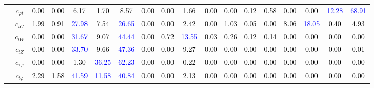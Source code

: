 \documentclass{article}
\begin{document}
\begin{landscape}
\begin{table}[H]
\begin{tabular}{|c|c|c|c|c|c|c|c|c|c|c|c|c|c|c|c|c|c|}
 & $c_{\varphi t}$ & \textcolor{black}{0.00} & \textcolor{black}{0.00} & \textcolor{black}{6.17} & \textcolor{black}{1.70} & \textcolor{black}{8.57} & \textcolor{black}{0.00} & \textcolor{black}{0.00} & \textcolor{black}{1.66} & \textcolor{black}{0.00} & \textcolor{black}{0.00} & \textcolor{black}{0.12} & \textcolor{black}{0.58} & \textcolor{black}{0.00} & \textcolor{black}{0.00} & \textcolor{blue}{12.28} & \textcolor{blue}{68.91}\\ \cline{2-18}
 & $c_{tG}$ & \textcolor{black}{1.99} & \textcolor{black}{0.91} & \textcolor{blue}{27.98} & \textcolor{black}{7.54} & \textcolor{blue}{26.65} & \textcolor{black}{0.00} & \textcolor{black}{0.00} & \textcolor{black}{2.42} & \textcolor{black}{0.00} & \textcolor{black}{1.03} & \textcolor{black}{0.05} & \textcolor{black}{0.00} & \textcolor{black}{8.06} & \textcolor{blue}{18.05} & \textcolor{black}{0.40} & \textcolor{black}{4.93}\\ \cline{2-18}
 & $c_{tW}$ & \textcolor{black}{0.00} & \textcolor{black}{0.00} & \textcolor{blue}{31.67} & \textcolor{black}{9.07} & \textcolor{blue}{44.44} & \textcolor{black}{0.00} & \textcolor{black}{0.72} & \textcolor{blue}{13.55} & \textcolor{black}{0.03} & \textcolor{black}{0.26} & \textcolor{black}{0.12} & \textcolor{black}{0.14} & \textcolor{black}{0.00} & \textcolor{black}{0.00} & \textcolor{black}{0.00} & \textcolor{black}{0.00}\\ \cline{2-18}
 & $c_{tZ}$ & \textcolor{black}{0.00} & \textcolor{black}{0.00} & \textcolor{blue}{33.70} & \textcolor{black}{9.66} & \textcolor{blue}{47.36} & \textcolor{black}{0.00} & \textcolor{black}{0.00} & \textcolor{black}{9.27} & \textcolor{black}{0.00} & \textcolor{black}{0.00} & \textcolor{black}{0.00} & \textcolor{black}{0.00} & \textcolor{black}{0.00} & \textcolor{black}{0.00} & \textcolor{black}{0.00} & \textcolor{black}{0.01}\\ \cline{2-18}
 & $c_{\tau \varphi}$ & \textcolor{black}{0.00} & \textcolor{black}{0.00} & \textcolor{black}{1.30} & \textcolor{blue}{36.25} & \textcolor{blue}{62.23} & \textcolor{black}{0.00} & \textcolor{black}{0.00} & \textcolor{black}{0.22} & \textcolor{black}{0.00} & \textcolor{black}{0.00} & \textcolor{black}{0.00} & \textcolor{black}{0.00} & \textcolor{black}{0.00} & \textcolor{black}{0.00} & \textcolor{black}{0.00} & \textcolor{black}{0.00}\\ \cline{2-18}
 & $c_{t \varphi}$ & \textcolor{black}{2.29} & \textcolor{black}{1.58} & \textcolor{blue}{41.59} & \textcolor{blue}{11.58} & \textcolor{blue}{40.84} & \textcolor{black}{0.00} & \textcolor{black}{0.00} & \textcolor{black}{2.13} & \textcolor{black}{0.00} & \textcolor{black}{0.00} & \textcolor{black}{0.00} & \textcolor{black}{0.00} & \textcolor{black}{0.00} & \textcolor{black}{0.00} & \textcolor{black}{0.00} & \textcolor{black}{0.00}\\ \hline

\end{tabular}
\end{table}
\end{landscape}
\end{document}
